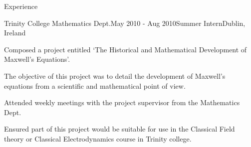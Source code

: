 \documentclass{resume} %
\begin{document}
\begin{rSection}{Experience}

\begin{rSubsection}{Trinity College Mathematics Dept.}{May 2010 - Aug 2010}{Summer Intern}{Dublin, Ireland}
\item Composed a project entitled `The Historical and Mathematical Development of Maxwell's Equations'.
\item The objective of this project was to detail the development of Maxwell's equations from a scientific and mathematical point of view.
\item  Attended weekly meetings with the project supervisor from the Mathematics Dept.
\item Ensured part of this project would be suitable for use in the Classical Field theory or Classical Electrodynamics course in Trinity college.

\end{rSubsection}


%
%
\end{rSection}

\end{document}
